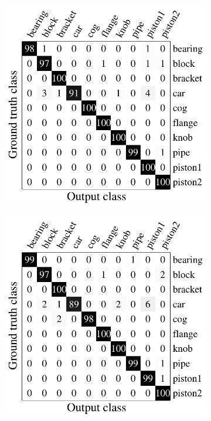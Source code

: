 \begin{figure}[ht]
\begin{subfigure}[t]{0.32\linewidth}
	\end{subfigure}
	\begin{subfigure}[t]{0.32\linewidth}
		\label{fig/reg/confusion_minent}
		\includegraphics[width=1\linewidth]{fig/reg/confusion_minent.pdf}
	\end{subfigure}
	\begin{subfigure}[t]{0.32\linewidth}
		\label{fig/reg/confusion_blk}
		\includegraphics[width=1\linewidth]{fig/reg/confusion_blk.pdf}

\end{subfigure}
\end{figure}
